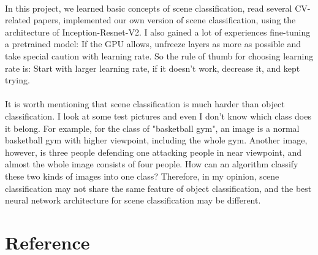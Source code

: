 \documentclass{gapd}
\begin{document}
\paragraph{}
\lettrine{I}{}n this project, we learned basic concepts of scene classification, read several CV-related papers, implemented our own version of scene classification, using the architecture of Inception-Resnet-V2. I also gained a lot of experiences fine-tuning a pretrained model: If the GPU allows, unfreeze layers as more as possible and take special caution with learning rate. So the rule of thumb for choosing learning rate is: Start with larger learning rate, if it doesn't work, decrease it, and kept trying. 

\paragraph{} 
	It is worth mentioning that scene classification is much harder than object classification. I look at some test pictures and even I don't know which class does it belong. For example, for the class of "basketball gym", an image is a normal basketball gym with higher viewpoint, including the whole gym. Another image, however, is three people defending one attacking people in near viewpoint, and almost the whole image consists of four people. How can an algorithm classify these two kinds of images into one class? Therefore, in my opinion, scene classification may not share the same feature of object classification, and the best neural network architecture for scene classification may be different. 

		

\section{Reference}

\end{document}
